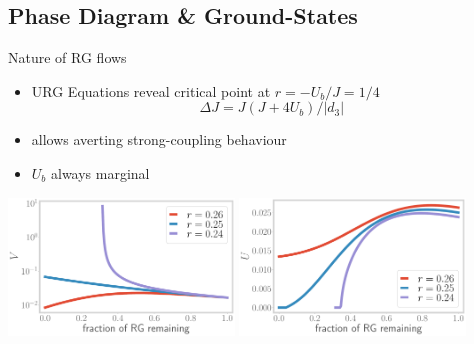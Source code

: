 \documentclass[8pt,aspectratio=169]{beamer}
\newcommand{\nitem}{\item[\ding{51}]}
\begin{document}
\begin{frame}{}
\section{Phase Diagram \& Ground-States}
\end{frame}

\begin{frame}{Nature of RG flows}

\begin{itemize}
	\nitem URG Equations reveal \alert{critical} point at  \(r = -U_b / J = 1/4\)
	\[\Delta J = J(J + 4U_b)/|d_3|\]
\nitem allows averting strong-coupling behaviour\\[5pt]
\nitem \(U_b\) always marginal
\end{itemize}

\vspace*{\fill}

\includegraphics[width=0.45\textwidth]{V_Ub.pdf}
\hspace*{\fill}
\includegraphics[width=0.45\textwidth]{U_Ub.pdf}

\end{frame}
\end{document}
